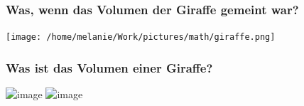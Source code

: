 \documentclass{beamer}
\begin{document}
\begin{frame}
\end{frame}


\begin{frame}
\frametitle{Was, wenn das Volumen der Giraffe gemeint war?}

\begin{center}
\texttt{[image: /home/melanie/Work/pictures/math/giraffe.png]}
\end{center}

\end{frame}



\begin{frame}
\end{frame}



\begin{frame}
\frametitle{Was ist das Volumen einer Giraffe?}

 
\begin{center}
\includegraphics<1>[width=0.6\textwidth]{/home/melanie/Work/pictures/mathematical_biology/giraffe_volumen_1.png}
\includegraphics<2>[width=0.6\textwidth]{/home/melanie/Work/pictures/mathematical_biology/giraffe_volumen_2.png}
\end{center}



\end{frame}
\end{document}
